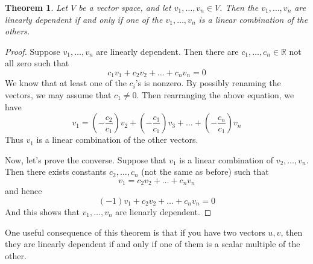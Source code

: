 \documentclass[10pt]{article}
\newtheorem{theorem}{Theorem}
\theoremstyle{definition}
\newcommand{\R}{\mathbb{R}}           %
\begin{document}
\begin{theorem}
  Let $V$ be a vector space, and let $v_{1},\ldots,v_{n}\in V$. Then the
  $v_{1},\ldots,v_{n}$ are linearly dependent if and only if one of the
  $v_{1},\ldots,v_{n}$ is a linear combination of the others.
\end{theorem}
\begin{proof}
  Suppose $v_{1},\ldots,v_{n}$ are linearly dependent. Then there are
  $c_{1},\ldots,c_{n}\in \R$ not all zero such that
  \begin{equation*}
    c_{1}v_{1}+c_{2}v_{2}+\ldots+c_{n}v_{n}=0
  \end{equation*}
  We know that at least one of the $c_{i}$'s is nonzero. By possibly renaming
  the vectors, we may assume that $c_{1}\neq 0$. Then rearranging the above
  equation, we have
  \begin{equation*}
    v_{1} = \left(-\frac{c_{2}}{c_{1}}\right)v_{2}+ \left(-\frac{c_{3}}{c_{1}}\right)v_{3}+\ldots+ \left(-\frac{c_{n}}{c_{1}}\right)v_{n}
  \end{equation*}
  Thus $v_{1}$ is a linear combination of the other vectors.

  Now, let's prove the converse. Suppose that $v_{1}$ is a linear combination
  of $v_{2},\ldots,v_{n}$. Then there exists constants $c_{2},\ldots,c_{n}$
  (not the same as before) such that
  \begin{equation*}
    v_{1} = c_{2}v_{2}+\ldots+c_{n}v_{n}
  \end{equation*}
  and hence
  \begin{equation*}
    (-1)v_{1}+c_{2}v_{2}+\ldots+c_{n}v_{n} =0
  \end{equation*}
  And this shows that $v_{1},\ldots,v_{n}$ are lienarly dependent.
\end{proof}


One useful consequence of this theorem is that if you have two vectors $u,v$, then
they are linearly dependent if and only if one of them is a scalar multiple of
the other.
\end{document}
